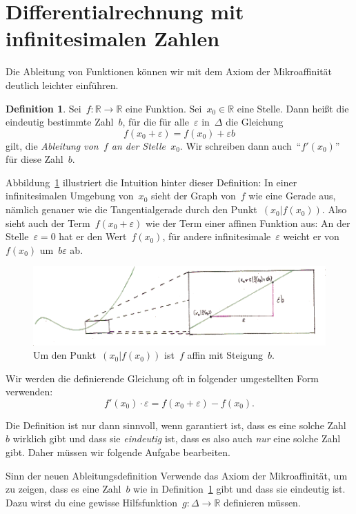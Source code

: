 \documentclass{zirkelblatt}
\newcommand{\RR}{\mathbb{R}}
\theoremstyle{definition}
\newtheorem{defn}{Definition}[section]
\theoremstyle{plain}
\theoremstyle{remark}
\begin{document}
\section{Differentialrechnung mit infinitesimalen Zahlen}

Die Ableitung von Funktionen können wir mit dem Axiom der Mikroaffinität
deutlich leichter einführen.

\begin{defn}\label{defn:sdg-ableitung}
Sei~$f : \RR \to \RR$ eine Funktion. Sei~$x_0 \in \RR$ eine Stelle.
Dann heißt die eindeutig bestimmte Zahl~$b$, für die für alle~$\varepsilon$
in~$\Delta$ die Gleichung
\[ f(x_0 + \varepsilon) = f(x_0) + \varepsilon b \]
gilt, die \emph{Ableitung von~$f$ an der Stelle~$x_0$}. Wir schreiben dann
auch~"`$f'(x_0)$"' für diese Zahl~$b$.\end{defn}

Abbildung~\ref{fig:ableitung-sdg} illustriert die Intuition hinter dieser
Definition: In einer infinitesimalen Umgebung von~$x_0$ sieht der Graph von~$f$
wie eine Gerade aus, nämlich genauer wie die Tangentialgerade durch den
Punkt~$(x_0|f(x_0))$. Also sieht auch der Term~$f(x_0 + \varepsilon)$ wie der
Term einer affinen Funktion aus: An der Stelle~$\varepsilon = 0$ hat er den
Wert~$f(x_0)$, für andere infinitesimale~$\varepsilon$ weicht er von~$f(x_0)$
um~$b \varepsilon$ ab.

\begin{figure}[b]
  \centering
  \includegraphics{sdg-ableitung}
  \caption{\label{fig:ableitung-sdg}Um den Punkt~$(x_0|f(x_0))$ ist~$f$ affin
  mit Steigung~$b$.}
\end{figure}

Wir werden die definierende Gleichung oft in folgender umgestellten Form
verwenden:
\[ f'(x_0) \cdot \varepsilon = f(x_0 + \varepsilon) - f(x_0). \]

Die Definition ist nur dann sinnvoll, wenn garantiert ist, dass es eine
solche Zahl~$b$ wirklich gibt und dass sie \emph{eindeutig} ist, dass es also
auch \emph{nur} eine solche Zahl gibt. Daher müssen wir folgende Aufgabe
bearbeiten.

\begin{aufgabeShaded}{Sinn der neuen Ableitungsdefinition}
Verwende das Axiom der Mikroaffinität, um zu zeigen, dass es eine Zahl~$b$ wie in
Definition~\ref{defn:sdg-ableitung} gibt und dass sie eindeutig ist. Dazu wirst
du eine gewisse Hilfsfunktion~$g : \Delta \to \RR$ definieren müssen.
\end{aufgabeShaded}
\end{document}
